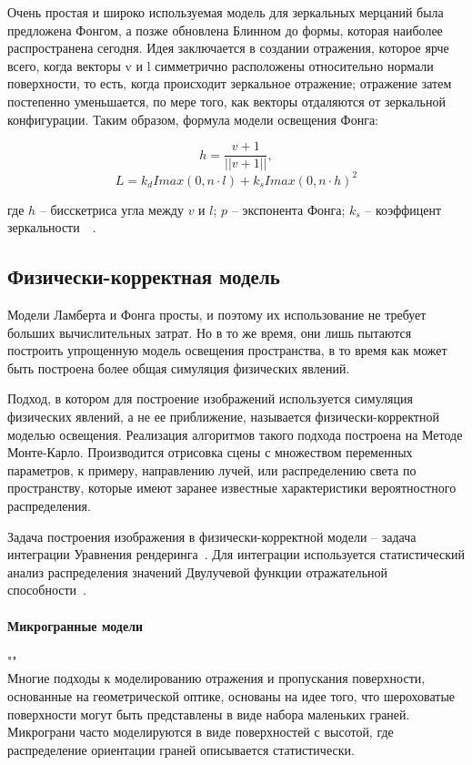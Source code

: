 Очень простая и широко используемая модель для зеркальных мерцаний была 
предложена Фонгом, а позже обновлена Блинном до 
формы, которая наиболее распространена сегодня. Идея заключается в создании 
отражения, которое ярче всего, когда векторы v и l симметрично расположены 
относительно нормали поверхности, то есть, когда происходит зеркальное 
отражение; отражение затем постепенно уменьшается, по мере того, 
как векторы отдаляются от зеркальной конфигурации. Таким образом, формула модели
освещения Фонга:

\begin{equation}
    h = \frac{v + 1}{||v+1||},
\end{equation}
\begin{equation}
    L = k_d I max(0, n \cdot l) + k_s I max(0, n \cdot  h)^2
\end{equation}

где $h$ -- бисскетриса угла между $v$ и $l$; $p$ -- экспонента Фонга; $k_s$ -- коэффицент зеркальности~\cite{IFCGP}~\cite{FoCG}.

\subsection{Физически-корректная модель}

Модели Ламберта и Фонга просты, и поэтому их использование не требует больших вычислительных
затрат. Но в то же время, они лишь пытаются построить упрощенную модель освещения пространства, в то время как может быть построена более общая симуляция физических явлений.

Подход, в котором для построение изображений используется симуляция физических 
явлений, а не ее приближение, называется физически-корректной моделью освещения.
Реализация алгоритмов такого подхода построена на Методе Монте-Карло. Производится
отрисовка сцены с множеством переменных параметров, к примеру, направлению лучей,
или распределению света по пространству, которые имеют заранее известные 
характеристики вероятностного распределения.

Задача построения изображения в физически-корректной модели -- задача 
интеграции Уравнения рендеринга~\cite{EoR}. Для интеграции используется
статистический анализ распределения значений Двулучевой функции отражательной 
способности~\cite{PBRT3e}.

\paragraph{Микрогранные модели}""\\
Многие подходы к моделированию отражения и пропускания поверхности, основанные 
на геометрической оптике, основаны на идее того, что шероховатые поверхности 
могут быть представлены в виде набора маленьких граней. Микрограни часто моделируются 
в виде поверхностей с высотой, где распределение ориентации граней описывается статистически.


